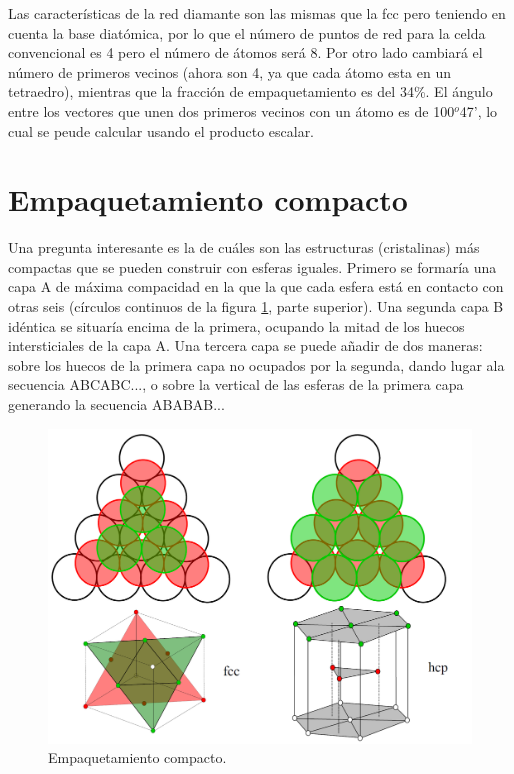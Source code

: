 Las características de la red diamante son las mismas que la fcc pero teniendo en cuenta la base diatómica, por lo que el número de puntos de red para la celda convencional es 4 pero el número de átomos será 8. Por otro lado cambiará el número de primeros vecinos (ahora son 4, ya que cada átomo esta en un tetraedro), mientras que la fracción de empaquetamiento es del 34\%. El ángulo entre los vectores que unen dos primeros vecinos con un átomo es de 100$^o$47', lo cual se peude calcular usando el producto escalar.



\section{Empaquetamiento compacto}

Una pregunta interesante es la de cuáles son las estructuras (cristalinas) más compactas que se pueden construir con esferas iguales. Primero se formaría una capa A de máxima compacidad en la que la que cada esfera está en contacto con otras seis (círculos continuos de la figura \ref{Fig:01-04}, parte superior). Una segunda capa B idéntica se situaría encima de la primera, ocupando la mitad de los huecos intersticiales de la capa A. Una tercera capa se puede añadir de dos maneras: sobre los huecos de la primera capa no ocupados por la segunda, dando lugar ala secuencia ABCABC..., o sobre la vertical de las esferas de la primera capa generando la secuencia ABABAB...

\begin{figure}[h!] \centering
    \includegraphics[scale=0.2]{Cuerpo/Ch_01/Empaquetamiento_compacto.png}
    \caption{Empaquetamiento compacto.}
    \label{Fig:01-04}
\end{figure}

